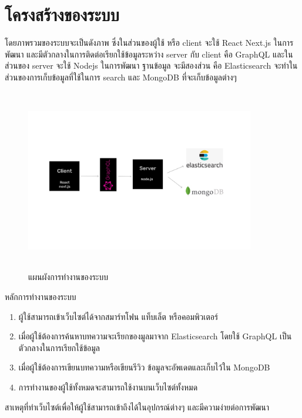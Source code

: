  \section{โครงสร้างของระบบ}
 โดยภาพรวมของระบบจะเป็นดังภาพ ซึ่งในส่วนของผู้ใช้ หรือ client จะใช้ React Next.js ในการพัฒนา และมีตัวกลางในการติดต่อเรียกใช้ข้อมูลระหว่าง server กับ client คือ GraphQL และในส่วนของ server จะใช้ Nodejs ในการพัฒนา ฐานข้อมูล จะมีสองส่วน คือ Elasticsearch จะทำในส่วนของการเก็บข้อมูลที่ใช้ในการ search และ MongoDB ที่จะเก็บข้อมูลต่างๆ
\begin{figure}[h]
\begin{center}
\includegraphics[width=10cm, height=8cm]{database.jpg}
\end{center}
\caption[Application Model]{แผนผังการทำงานของระบบ}
\end{figure}
หลักการทำงานของระบบ
\begin{enumerate}
  \item ผู้ใช้สามารถเข้าเว็บไซต์ได้จากสมาร์ทโฟน แท็บเล็ต หรือคอมพิวเตอร์
  \item เมื่อผู้ใช้ต้องการค้นหาบทความจะเรียกของมูลมาจาก Elasticsearch โดยใช้ GraphQL เป็นตัวกลางในการเรียกใช้ข้อมูล
  \item เมื่อผู้ใช้ต้องการเขียนบทความหรือเขียนรีวิว ข้อมูลจะอัพเดตและเก็บไว้ใน MongoDB 
  \item การทำงานของผู้ใช้ทั้งหมดจะสามารถใช้งานบนเว็บไซต์ทั้งหมด
\end{enumerate}
สาเหตุที่ทำเว็บไซต์เพื่อให้ผู้ใช้สามารถเข้าถึงได้ในอุปกรณ์ต่างๆ และมีความง่ายต่อการพัฒนา
